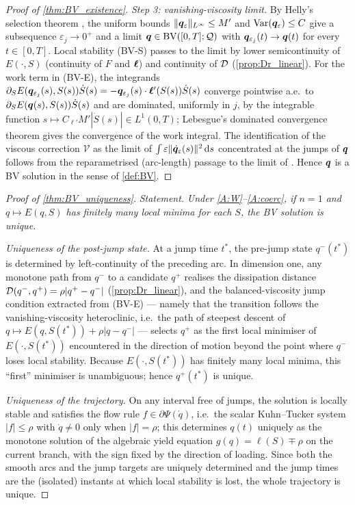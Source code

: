 \begin{proof}[Proof of \cref{thm:BV_existence}]
\emph{Step 3: vanishing-viscosity limit.} By Helly's selection theorem
\cite[Thm.~3.3]{AmbrosioFuscoPallara}, the uniform bounds
$\|\bm{q}_\varepsilon\|_{L^\infty}\le M'$ and $\mathrm{Var}(\bm{q}_\varepsilon)\le C$
give a subsequence $\varepsilon_j\to0^+$ and a limit
$\bm{q}\in\mathrm{BV}([0,T];\mathcal{Q})$ with $\bm{q}_{\varepsilon_j}(t)\to\bm{q}(t)$
for every $t\in[0,T]$. Local stability (BV-S) passes to the limit by
lower semicontinuity of $E(\cdot,S)$ (continuity of $F$ and $\bm{\ell}$)
and continuity of $\mathcal{D}$ (\cref{prop:Dr_linear}). For the work term in
(BV-E), the integrands
$\partial_S E(\bm{q}_{\varepsilon_j}(s),S(s))\dot S(s)=-\bm{q}_{\varepsilon_j}(s)\cdot\bm{\ell}'(S(s))\dot S(s)$
converge pointwise a.e.\ to $\partial_S E(\bm{q}(s),S(s))\dot S(s)$ and
are dominated, uniformly in $j$, by the integrable function
$s\mapsto C_{\ell'}M'|\dot S(s)|\in L^1(0,T)$; Lebesgue's dominated
convergence theorem gives the convergence of the work integral. The
identification of the viscous correction $\mathcal V$ as the limit of
$\int\varepsilon\|\dot{\bm{q}}_\varepsilon(s)\|^2 \mathop{}\!\mathrm{d} s$ concentrated at the jumps
of $\bm{q}$ follows from the reparametrised (arc-length) passage to the
limit of \cite[Thm.~3.3.2]{MielkeRoubicek}. Hence $\bm{q}$ is a BV
solution in the sense of \cref{def:BV}.
\end{proof}

\begin{proof}[Proof of \cref{thm:BV_uniqueness}]
\emph{Statement.} \emph{Under \ref{A:W}--\ref{A:coerc}, if $n=1$ and
$q\mapsto E(q,S)$ has finitely many local minima for each $S$, the BV
solution is unique.}

\smallskip
\emph{Uniqueness of the post-jump state.} At a jump time $t^\ast$, the
pre-jump state $q^-(t^\ast)$ is determined by left-continuity of the
preceding arc. In dimension one, any monotone path from $q^-$ to a
candidate $q^+$ realises the dissipation distance $\mathcal{D}(q^-,q^+)=\rho|q^+-q^-|$
(\cref{prop:Dr_linear}), and the balanced-viscosity jump condition
extracted from (BV-E) --- namely that the transition follows the
vanishing-viscosity heteroclinic, i.e.\ the path of steepest descent of
$q\mapsto E(q,S(t^\ast))+\rho|q-q^-|$ --- selects $q^+$ as the first
local minimiser of $E(\cdot,S(t^\ast))$ encountered in the direction of
motion beyond the point where $q^-$ loses local stability. Because
$E(\cdot,S(t^\ast))$ has finitely many local minima, this ``first''
minimiser is unambiguous; hence $q^+(t^\ast)$ is unique.

\emph{Uniqueness of the trajectory.} On any interval free of jumps, the
solution is locally stable and satisfies the flow rule
$f\in\partial\Psi(\dot q)$, i.e.\ the scalar Kuhn--Tucker system
$|f|\le\rho$ with $\dot q\ne0$ only when $|f|=\rho$; this determines
$q(t)$ uniquely as the monotone solution of the algebraic yield
equation $g(q)=\ell(S)\mp\rho$ on the current branch, with the sign
fixed by the direction of loading. Since both the smooth arcs and the
jump targets are uniquely determined and the jump times are the
(isolated) instants at which local stability is lost, the whole
trajectory is unique.
\end{proof}

